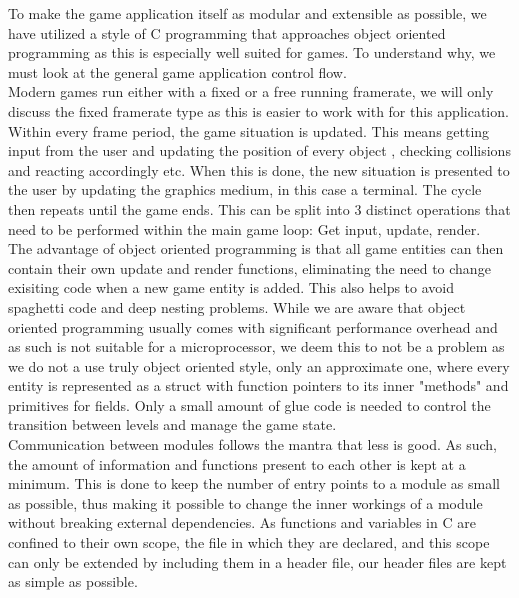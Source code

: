 To make the game application itself as modular and extensible as possible, we have utilized a
style of C programming that approaches object oriented programming as this is especially well
suited for games. To understand why, we must look at the general game application control flow. \\

Modern games run either with a fixed or a free running framerate, we will only discuss the fixed
framerate type as this is easier to work with for this application. Within every frame period, the
game situation is updated. This means getting input from the user and  updating the position of every object
, checking collisions and reacting accordingly etc. When this is done, the new situation is presented to the
 user by updating the graphics medium, in this case a terminal. The cycle then repeats until the game
ends. This can be split into 3 distinct operations that need to be performed within the main game loop:
Get input, update, render. \\

The advantage of object oriented programming is that all game entities can then contain their own
update and render functions, eliminating the need to change exisiting code when a new game entity is added.
This also helps to avoid spaghetti code and deep nesting problems. While we are aware that object oriented
programming usually comes with significant performance overhead and as such is not suitable for a microprocessor,
we deem this to not be a problem as we do not a use truly object oriented style, only an approximate one, where every
entity is represented as a struct with function pointers to its inner "methods" and primitives for fields.
Only a small amount of glue code is needed to control the transition between levels and manage the game state. \\

Communication between modules follows the mantra that less is good. As such, the amount of information and functions
present to each other is kept at a minimum. This is done to keep the number of entry points to a module as small
as possible, thus making it possible to change the inner workings of a module without breaking external dependencies.
As functions and variables in C are confined to their own scope, the file in which they are declared, and this
scope can only be extended by including them in a header file, our header files are kept as simple as possible. \\

